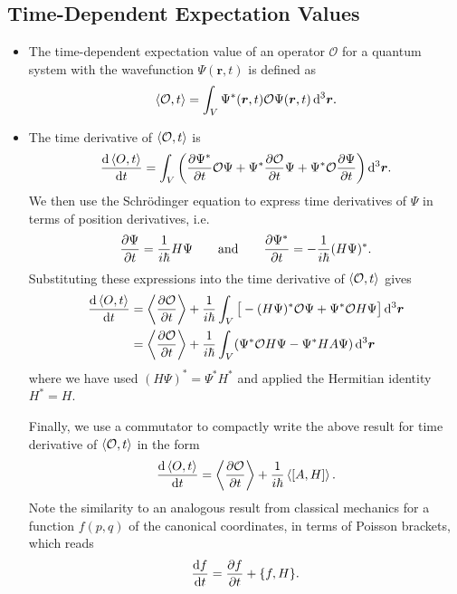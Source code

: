 \documentclass[11pt, a4paper]{article}
\newcommand{\diff}{\mathop{}\!\mathrm{d}} %
\newcommand{\dr}{\diff^{3} \r}  %
\newcommand{\eqtext}[1]{\qquad \text{#1} \qquad}
\newcommand{\Schro}{Schr\"{o}dinger\xspace}
\renewcommand{\vec}[1]{\bm{#1}}  %
\renewcommand{\r}{\vec{r}}  %
\renewcommand{\O}{\mathcal{O}}  %
\renewcommand{\P}{\Psi}  %
\begin{document}
\subsection{Time-Dependent Expectation Values}
\begin{itemize}
	\item The time-dependent expectation value of an operator $ \O $ for a quantum system with the wavefunction $ \P(\r, t) $ is defined as
	\begin{equation*}
		\ev{\O, t} = \int_{V} \P^{*}(\r, t) \O \P(\r, t) \dr.
	\end{equation*}
	
	\item The time derivative of $ \ev{\O, t} $ is
	\begin{equation*}
		\dv{\ev{O, t}}{t} = \int_{V} \left(\pdv{\P^{*}}{t} \O \P + \P^{*}\pdv{\O}{t}\P + \P^{*}\O \pdv{\P}{t}\right) \dr.
	\end{equation*}
	We then use the \Schro equation to express time derivatives of $ \P $ in terms of position derivatives, i.e.
	\begin{equation*}
		\pdv{\P}{t} = \frac{1}{i\hbar}H \P \eqtext{and} \pdv{\P^{*}}{t} = -\frac{1}{i\hbar}(H \P)^{*}.
	\end{equation*}
	Substituting these expressions into the time derivative of $ \ev{\O, t} $ gives
	\begin{align*}
		\dv{\ev{O, t}}{t} &= \ev{\pdv{\O}{t}} + \frac{1}{i \hbar} \int_{V} \big[- (H\P)^{*}\O \P + \P^{*}\O H \P \big] \dr\\
		& = \ev{\pdv{\O}{t}} + \frac{1}{i \hbar} \int_{V} (\P^{*}\O H \P - \P^{*}H A \P) \dr
	\end{align*}
	where we have used $ (H \P)^{*} = \P^{*}H^{*} $ and applied the Hermitian identity $ H^{*} = H $. 
	
	Finally, we use a commutator to compactly write the above result for time derivative of $ \ev{\O, t} $ in the form
	\begin{equation*}
		\dv{\ev{O, t}}{t} =  \ev{\pdv{\O}{t}} + \frac{1}{i\hbar}\ev{[A, H]}.
	\end{equation*}
	Note the similarity to an analogous result from classical mechanics for a function $ f(p, q) $ of the canonical coordinates, in terms of Poisson brackets, which reads 
	\begin{equation*}
		\dv{f}{t} = \pdv{f}{t} + \{f, H\}.
	\end{equation*}
\end{itemize}
\end{document}
